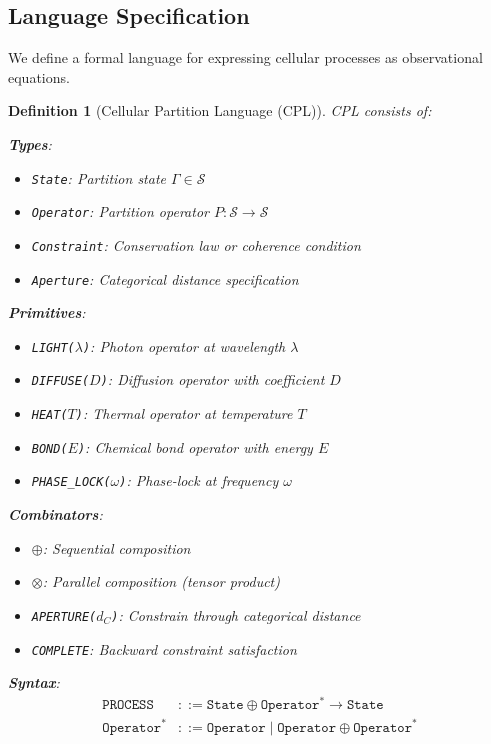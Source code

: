 \documentclass[aps,prd,twocolumn,superscriptaddress,floatfix,nofootinbib]{revtex4-2}
\newtheorem{definition}[theorem]{Definition}
\theoremstyle{remark}
\newcommand{\Sspace}{\mathcal{S}}
\newcommand{\Pop}{P}
\newcommand{\Gstate}{\Gamma}
\begin{document}
\subsection{Language Specification}

We define a formal language for expressing cellular processes as observational equations.

\begin{definition}[Cellular Partition Language (CPL)]
\label{def:cpl}
CPL consists of:

\textbf{Types}:
\begin{itemize}
\item \texttt{State}: Partition state $\Gstate \in \Sspace$
\item \texttt{Operator}: Partition operator $\Pop: \Sspace \to \Sspace$
\item \texttt{Constraint}: Conservation law or coherence condition
\item \texttt{Aperture}: Categorical distance specification
\end{itemize}

\textbf{Primitives}:
\begin{itemize}
\item \texttt{LIGHT($\lambda$)}: Photon operator at wavelength $\lambda$
\item \texttt{DIFFUSE($D$)}: Diffusion operator with coefficient $D$
\item \texttt{HEAT($T$)}: Thermal operator at temperature $T$
\item \texttt{BOND($E$)}: Chemical bond operator with energy $E$
\item \texttt{PHASE\_LOCK($\omega$)}: Phase-lock at frequency $\omega$
\end{itemize}

\textbf{Combinators}:
\begin{itemize}
\item \texttt{$\oplus$}: Sequential composition
\item \texttt{$\otimes$}: Parallel composition (tensor product)
\item \texttt{APERTURE($d_C$)}: Constrain through categorical distance
\item \texttt{COMPLETE}: Backward constraint satisfaction
\end{itemize}

\textbf{Syntax}:
\begin{align}
\texttt{PROCESS} &::= \texttt{State} \oplus \texttt{Operator}^* \to \texttt{State} \\
\texttt{Operator}^* &::= \texttt{Operator} \mid \texttt{Operator} \oplus \texttt{Operator}^*
\end{align}
\end{definition}
\end{document}
